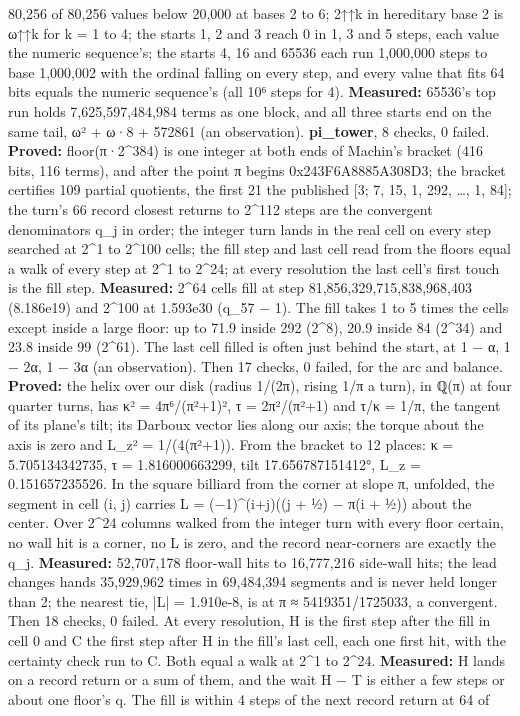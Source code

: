 \begin{description}
80,256 of 80,256 values below 20,000 at bases 2 to 6; 2↑↑k in hereditary base 2 is ω↑↑k for k = 1 to 4; the starts 1, 2 and 3 reach 0 in 1, 3 and 5 steps, each value the numeric sequence's; the starts 4, 16 and 65536 each run 1,000,000 steps to base 1,000,002 with the ordinal falling on every step, and every value that fits 64 bits equals the numeric sequence's (all 10⁶ steps for 4). \textbf{Measured:} 65536's top run holds 7,625,597,484,984 terms as one block, and all three starts end on the same tail, ω² + ω·8 + 572861 (an observation). \textbf{pi\_\allowbreak{}tower}, 8 checks, 0 failed. \textbf{Proved:} floor(π·2\textasciicircum{}384) is one integer at both ends of Machin's bracket (416 bits, 116 terms), and after the point π begins 0x243F6A8885A308D3; the bracket certifies 109 partial quotients, the first 21 the published [3; 7, 15, 1, 292, …, 1, 84]; the turn's 66 record closest returns to 2\textasciicircum{}112 steps are the convergent denominators q\_\allowbreak{}j in order; the integer turn lands in the real cell on every step searched at 2\textasciicircum{}1 to 2\textasciicircum{}100 cells; the fill step and last cell read from the floors equal a walk of every step at 2\textasciicircum{}1 to 2\textasciicircum{}24; at every resolution the last cell's first touch is the fill step. \textbf{Measured:} 2\textasciicircum{}64 cells fill at step 81,856,329,715,838,968,403 (8.186e19) and 2\textasciicircum{}100 at 1.593e30 (q\_\allowbreak{}57 − 1). The fill takes 1 to 5 times the cells except inside a large floor: up to 71.9 inside 292 (2\textasciicircum{}8), 20.9 inside 84 (2\textasciicircum{}34) and 23.8 inside 99 (2\textasciicircum{}61). The last cell filled is often just behind the start, at 1 − α, 1 − 2α, 1 − 3α (an observation). Then 17 checks, 0 failed, for the arc and balance. \textbf{Proved:} the helix over our disk (radius 1/(2π), rising 1/π a turn), in ℚ(π) at four quarter turns, has κ² = 4π⁶/(π²+1)², τ = 2π²/(π²+1) and τ/κ = 1/π, the tangent of its plane's tilt; its Darboux vector lies along our axis; the torque about the axis is zero and L\_\allowbreak{}z² = 1/(4(π²+1)). From the bracket to 12 places: κ = 5.705134342735, τ = 1.816000663299, tilt 17.656787151412°, L\_\allowbreak{}z = 0.151657235526. In the square billiard from the corner at slope π, unfolded, the segment in cell (i, j) carries L = (−1)\textasciicircum{}(i+j)((j + ½) − π(i + ½)) about the center. Over 2\textasciicircum{}24 columns walked from the integer turn with every floor certain, no wall hit is a corner, no L is zero, and the record near-corners are exactly the q\_\allowbreak{}j. \textbf{Measured:} 52,707,178 floor-wall hits to 16,777,216 side-wall hits; the lead changes hands 35,929,962 times in 69,484,394 segments and is never held longer than 2; the nearest tie, |L| = 1.910e-8, is at π ≈ 5419351/1725033, a convergent. Then 18 checks, 0 failed. At every resolution, H is the first step after the fill in cell 0 and C the first step after H in the fill's last cell, each one first hit, with the certainty check run to C. Both equal a walk at 2\textasciicircum{}1 to 2\textasciicircum{}24. \textbf{Measured:} H lands on a record return or a sum of them, and the wait H − T is either a few steps or about one floor's q. The fill is within 4 steps of the next record return at 64 of 
\end{description}
